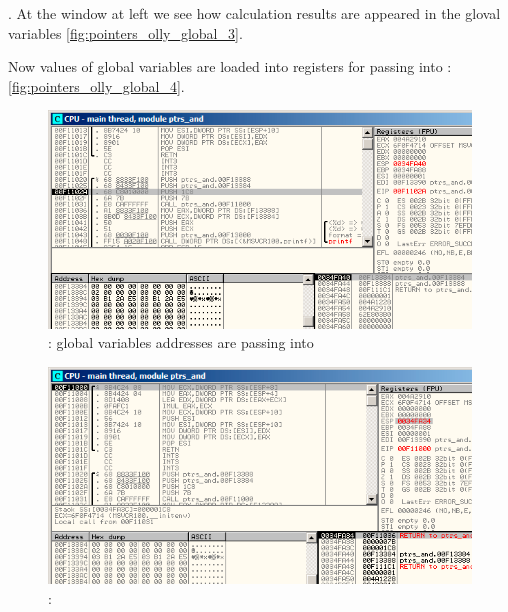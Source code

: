  \ttf.
{At the window at left we see how calculation results are appeared in the gloval variables} 
\figname \ref{fig:pointers_olly_global_3}.

{Now values of global variables are loaded into registers for passing into} \printf:
\figname \ref{fig:pointers_olly_global_4}.

\begin{figure}[H]
\centering
\includegraphics[scale=\FigScale]{patterns/061_pointers/olly_global1.png}
\caption{\olly: 
{global variables addresses are passing into} \ttf}
\label{fig:pointers_olly_global_1}
\end{figure}

\begin{figure}[H]
\centering
\includegraphics[scale=\FigScale]{patterns/061_pointers/olly_global2.png}
\caption{\olly: }
\label{fig:pointers_olly_global_2}
\end{figure}

